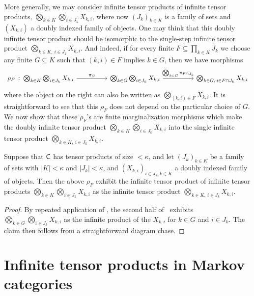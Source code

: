\documentclass[11pt]{article}
\begin{document}
More generally, we may consider infinite tensor products of infinite tensor products, $\bigotimes_{k \in K} \bigotimes_{i \in J_k} X_{k,i}$, where now $(J_k)_{k \in K}$ is a family of sets and $(X_{k,i})$ a doubly indexed family of objects. One may think that this doubly infinite tensor product should be isomorphic to the single-step infinite tensor product $\bigotimes_{k \in K, \: i \in J_k} X_{k,i}$. And indeed, if for every finite $F \subseteq \prod_{k \in K} J_k$ we choose any finite $G \subseteq K$ such that $(k,i) \in F$ implies $k \in G$, then we have morphisms
\begin{equation}
	\label{double_infproduct}
	\begin{tikzcd}[column sep=huge]
		\rho_F \: : \: \bigotimes_{k \in K} \bigotimes_{i \in J_k} X_{k,i} \ar{r}{\pi_G} & \bigotimes_{k \in G} \bigotimes_{i \in J_k} X_{k,i} \ar{r}{\bigotimes_{k \in G} \pi_{F \cap J_k}} & \bigotimes_{k \in G, \: i \in F \cap J_k} X_{k,i}
	\end{tikzcd}
\end{equation}
where the object on the right can also be written as $\bigotimes_{(k,i) \in F} X_{k,i}$. It is straightforward to see that this $\rho_F$ does not depend on the particular choice of $G$. We now show that these $\rho_F$'s are finite marginalization morphisms which make the doubly infinite tensor product $\bigotimes_{k \in K} \bigotimes_{i \in J_k} X_{k,i}$ into the single infinite tensor product $\bigotimes_{k \in K, \: i \in J_k} X_{k,i}$.

\begin{lemma}
	Suppose that $\mathsf{C}$ has tensor products of size $< \kappa$, and let $(J_k)_{k \in K}$ be a family of sets with $|K| < \kappa$ and $|J_k| < \kappa$, and $(X_{k,i})_{i \in J_k, k \in K}$ a doubly indexed family of objects. Then the above $\rho_F$ exhibit the infinite tensor product of infinite tensor products $\bigotimes_{k \in K} \bigotimes_{i \in J_k} X_{k,i}$ as the infinite tensor product $\bigotimes_{k \in K, \: i \in J_k} X_{k,i}$.
\end{lemma}
\begin{proof}
	By repeated application of , the second half of~ exhibits $\bigotimes_{k \in G} \bigotimes_{i \in J_k} X_{k,i}$ as the infinite product of the $X_{k,i}$ for $k \in G$ and $i \in J_k$. The claim then follows from a straightforward diagram chase.
\end{proof}

\section{Infinite tensor products in Markov categories}
\label{infprod_markov}
\end{document}
